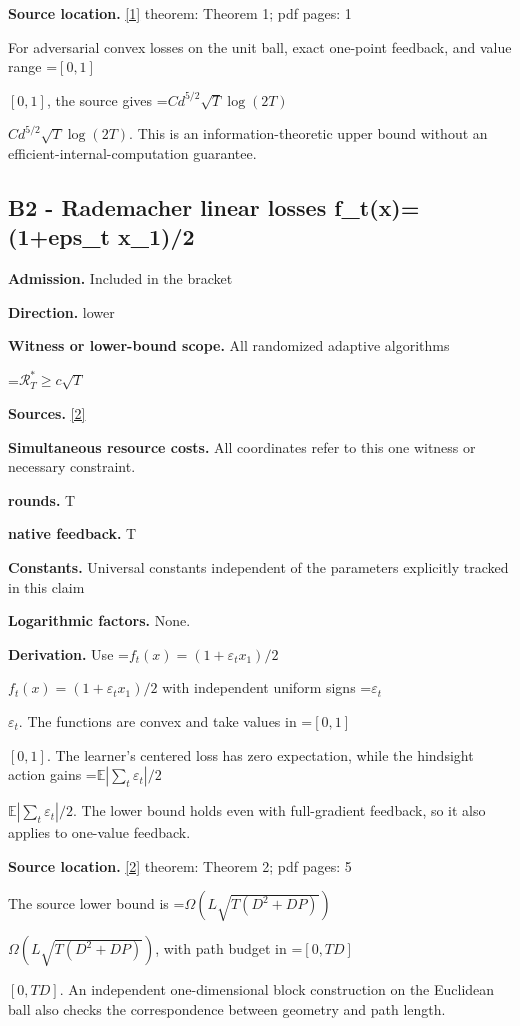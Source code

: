 \documentclass[10pt,a4paper]{article}
\newcommand{\AtlasMath}[1]{\par\begingroup\centering\setbox0=\hbox{$\displaystyle #1$}\ifdim\wd0>1.4\linewidth\typeout{ATLAS WIDE FORMULA: \the\wd0}\fi\ifdim\wd0>\linewidth\resizebox{\linewidth}{!}{\box0}\else\box0\fi\par\endgroup}
\newcommand{\AtlasInlineMath}[1]{\begingroup\setbox0=\hbox{$#1$}\ifdim\wd0>.4\linewidth\endgroup\AtlasMath{#1}\else\endgroup$#1$\fi}
\begin{document}
\textbf{Source location.} \href{https://tor-lattimore.com/downloads/papers/2020-cvx.pdf}{[1]} theorem: Theorem 1; pdf pages: 1

For adversarial convex losses on the unit ball, exact one-point feedback, and value range \AtlasInlineMath{[0,1]}, the source gives \AtlasInlineMath{Cd^{5/2}\sqrt T\log(2T)}. This is an information-theoretic upper bound without an efficient-internal-computation guarantee.

\subsection{B2 - Rademacher linear losses f\_t(x)=(1+eps\_t x\_1)/2}
\textbf{Admission.} Included in the bracket

\textbf{Direction.} lower

\textbf{Witness or lower-bound scope.} All randomized adaptive algorithms

\AtlasMath{\mathcal{R}_T^*\ge c\sqrt T}
\textbf{Sources.} \href{https://www.lamda.nju.edu.cn/lusy/pdf/zhang2018adaptive.pdf}{[2]}

\textbf{Simultaneous resource costs.} All coordinates refer to this one witness or necessary constraint.

\textbf{rounds.} T

\textbf{native feedback.} T

\textbf{Constants.} Universal constants independent of the parameters explicitly tracked in this claim

\textbf{Logarithmic factors.} None.

\textbf{Derivation.} Use \AtlasInlineMath{f_t(x)=(1+\varepsilon_t x_1)/2} with independent uniform signs \AtlasInlineMath{\varepsilon_t}. The functions are convex and take values in \AtlasInlineMath{[0,1]}. The learner's centered loss has zero expectation, while the hindsight action gains \AtlasInlineMath{\mathbb E|\sum_t\varepsilon_t|/2}. The lower bound holds even with full-gradient feedback, so it also applies to one-value feedback.

\textbf{Source location.} \href{https://www.lamda.nju.edu.cn/lusy/pdf/zhang2018adaptive.pdf}{[2]} theorem: Theorem 2; pdf pages: 5

The source lower bound is \AtlasInlineMath{\Omega(L\sqrt{T(D^2+DP)})}, with path budget in \AtlasInlineMath{[0,TD]}. An independent one-dimensional block construction on the Euclidean ball also checks the correspondence between geometry and path length.
\end{document}

